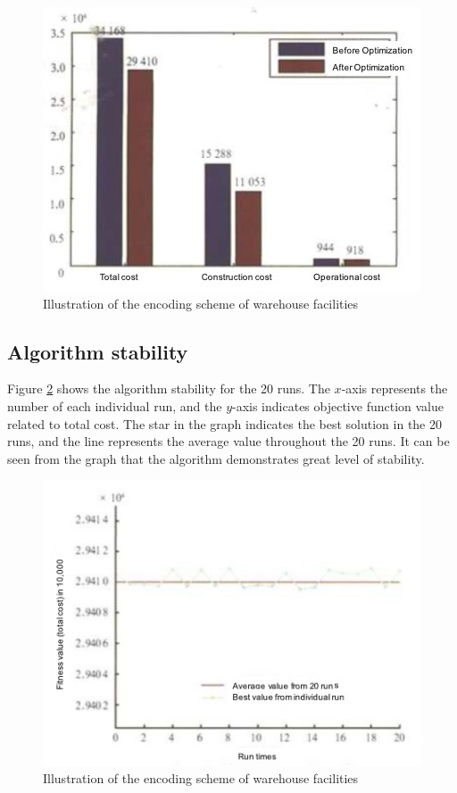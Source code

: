 \begin{figure}[h!]
	\begin{center}
		\includegraphics[width=0.8\linewidth]{sections/figure4.jpg}
		\caption{Illustration of the encoding scheme of warehouse facilities}
		\label{fig:fig4}
	\end{center}
\end{figure}


\subsection{Algorithm stability}
Figure \ref{fig:fig5} shows the algorithm stability for the 20 runs.
The $x$-axis represents the number of each individual run, and the $y$-axis indicates objective function value related to total cost.
The star in the graph indicates the best solution in the 20 runs, and the line represents the average value throughout the 20 runs.
It can be seen from the graph that the algorithm demonstrates great level of stability.


\begin{figure}[h!]
	\begin{center}
		\includegraphics[width=0.8\linewidth]{sections/figure5.jpg}
		\caption{Illustration of the encoding scheme of warehouse facilities}
		\label{fig:fig5}
	\end{center}
\end{figure}

